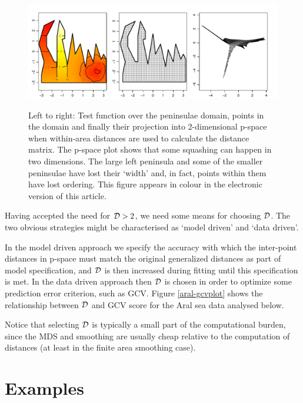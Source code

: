 \documentclass[useAMS, referee]{biom}
\begin{document}
\begin{figure}
\centering
\includegraphics[width=\textwidth]{examples/wt2/wt2-plot.pdf} \\
\caption{Left to right: Test function over the peninsulae domain, points in the domain and finally their projection into 2-dimensional p-space when within-area distances are used to calculate the distance matrix. The p-space plot shows that some squashing can happen in two dimensions. The large left peninsula and some of the smaller peninsulae have lost their `width' and, in fact, points within them have lost ordering. This figure appears in colour in the electronic version of this article.}
\label{wt2-plot}
\end{figure}

Having accepted the need for ${\cal D}>2$, we need some means for choosing $\cal D$. The two obvious strategies might be characterised as `model driven' and `data driven'. 

In the model driven approach we specify the accuracy with which the inter-point distances in p-space must match the original generalized distances as part of model specification, and $\cal D$ is then increased during fitting until this specification is met. In the data driven approach then $\cal D$ is chosen in order to optimize some prediction error criterion, such as GCV.  Figure \ref{aral-gcvplot} shows the relationship between $\cal D$ and GCV score for the Aral sea data analysed below.

Notice that selecting $\cal D$ is typically a small part of the computational burden, since the MDS and smoothing are usually cheap relative to the computation of distances (at least in the finite area smoothing case).


\section{Examples}
\label{examples}
\end{document}
